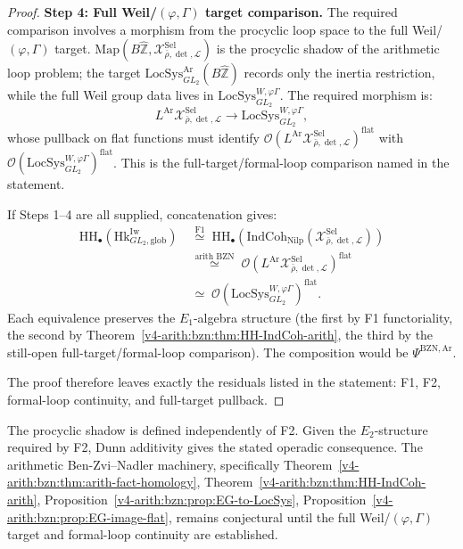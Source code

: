 \begin{proof}
\medskip\noindent\textbf{Step 4: Full Weil/\((\varphi,\Gamma)\) target comparison.}
The required comparison involves a morphism from the procyclic
loop space to the full Weil/\((\varphi,\Gamma)\) target.
\(\mathrm{Map}(B\widehat{\mathbb{Z}},\mathcal{X}^{\mathrm{Sel}}_{\bar\rho,\det,\mathcal{L}})\)
is the procyclic shadow of the arithmetic loop problem; the target
\(\mathrm{LocSys}_{GL_{2}}^{\mathrm{Ar}}(B\widehat{\mathbb{Z}})\)
records only the inertia restriction, while the full Weil group data
lives in \(\mathrm{LocSys}^{W,\varphi\Gamma}_{GL_{2}}\). The
required morphism is:
\begin{equation}
\label{v4-arith:bzn:eq:full-target-residual}
L^{\mathrm{Ar}}\mathcal{X}^{\mathrm{Sel}}_{\bar\rho,\det,\mathcal{L}}
\longrightarrow
\mathrm{LocSys}^{W,\varphi\Gamma}_{GL_{2}},
\end{equation}
whose pullback on flat functions must identify
\(\mathcal{O}(L^{\mathrm{Ar}}\mathcal{X}^{\mathrm{Sel}}_{\bar\rho,\det,\mathcal{L}})^{\mathrm{flat}}\)
with
\(\mathcal{O}(\mathrm{LocSys}^{W,\varphi\Gamma}_{GL_{2}})^{\mathrm{flat}}\).
This is the full-target/formal-loop comparison named in the statement.

\medskip If Steps 1--4 are all supplied, concatenation gives:
\begin{align}
\mathrm{HH}_{\bullet}(\mathrm{Hk}^{\mathrm{Iw}}_{GL_{2},\mathrm{glob}})\;&\overset{\text{F1}}{\simeq}\;\mathrm{HH}_{\bullet}(\mathrm{IndCoh}_{\mathrm{Nilp}}(\mathcal{X}^{\mathrm{Sel}}_{\bar\rho,\det,\mathcal{L}}))\\
&\overset{\text{arith BZN}}{\simeq}\;\mathcal{O}(L^{\mathrm{Ar}}\mathcal{X}^{\mathrm{Sel}}_{\bar\rho,\det,\mathcal{L}})^{\mathrm{flat}}\\
&\simeq\;\mathcal{O}(\mathrm{LocSys}^{W,\varphi\Gamma}_{GL_{2}})^{\mathrm{flat}}.
\end{align}
Each equivalence preserves the \(E_{1}\)-algebra structure (the
first by F1 functoriality, the second by
Theorem~\ref{v4-arith:bzn:thm:HH-IndCoh-arith}, the third by the still-open
full-target/formal-loop comparison). The composition would be
\(\Psi^{\mathrm{BZN,Ar}}\).

The proof therefore leaves exactly the residuals listed in the
statement: F1, F2, formal-loop continuity, and full-target pullback.
\end{proof}

\begin{remark}
\label{v4-arith:bzn:rem:unconditional-content}
The procyclic shadow is defined independently of F2. Given the
\(E_2\)-structure required by F2, Dunn additivity gives the stated
operadic consequence. The arithmetic
Ben-Zvi--Nadler machinery, specifically
Theorem~\ref{v4-arith:bzn:thm:arith-fact-homology},
Theorem~\ref{v4-arith:bzn:thm:HH-IndCoh-arith},
Proposition~\ref{v4-arith:bzn:prop:EG-to-LocSys},
Proposition~\ref{v4-arith:bzn:prop:EG-image-flat}, remains
conjectural until the full Weil/\((\varphi,\Gamma)\)
target and formal-loop continuity are established.
\end{remark}

